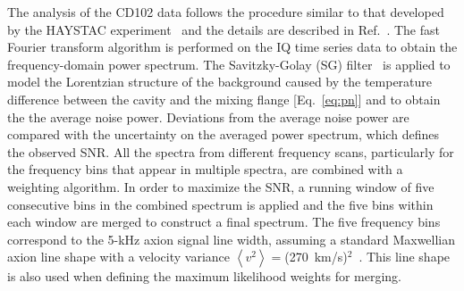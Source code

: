 \documentclass[%
 reprint,prl, %
superscriptaddress,
nobibnotes,
 amsmath,amssymb,
 aps,
]{revtex4-2}
\newcommand{\ma}{\ensuremath{m_a}}
\begin{document}
%




   The analysis of the CD102 data follows the procedure similar to that 
developed by the HAYSTAC experiment~\cite{HAYSTACII} and the details are 
described in Ref.~\cite{TASEHAnalysis}. The fast Fourier transform 
algorithm is performed on the IQ time series data to obtain the 
frequency-domain power spectrum. 
The Savitzky-Golay (SG) 
filter~\cite{SGFilter} is applied to model the Lorentzian structure of 
the background caused by the temperature difference between the cavity and 
the mixing flange [Eq.~\eqref{eq:pn}] and to obtain the 
the average noise power. 
Deviations from the average noise power are compared with the 
uncertainty on the averaged power spectrum, which defines the 
observed SNR. All the spectra from different 
frequency scans, particularly for the frequency bins that appear in 
multiple spectra, are combined with a weighting algorithm. 
In order to maximize the SNR, a running window of 
five consecutive bins in the combined spectrum is applied and the five bins 
within each window are merged to construct a final spectrum. 
The five frequency bins correspond to the 5-kHz axion signal line width,  
assuming a standard Maxwellian axion line shape with a velocity 
variance $\left<v^2\right>=$(270~km/s)$^2$~\cite{HAYSTACII}. 
This line shape is also used when defining the maximum likelihood 
weights for merging. 
\end{document}
